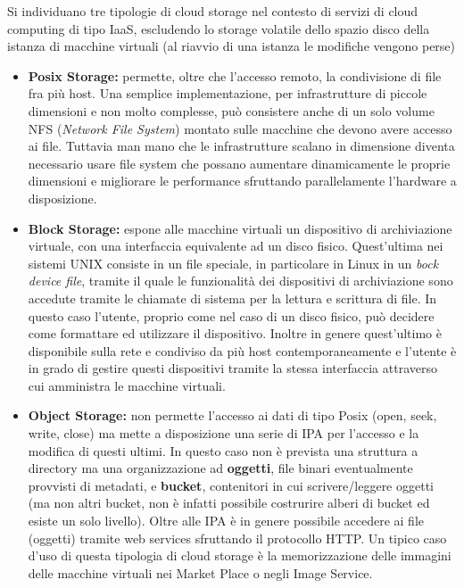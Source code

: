 \documentclass[italian,]{article}
\providecommand{\tightlist}{%
  \setlength{\itemsep}{0pt}\setlength{\parskip}{0pt}}
\begin{document}
Si individuano tre tipologie di cloud storage nel contesto di servizi di
cloud computing di tipo IaaS, escludendo lo storage volatile dello
spazio disco della istanza di macchine virtuali (al riavvio di una
istanza le modifiche vengono perse)

\begin{itemize}
\tightlist
\item
  \textbf{Posix Storage:} permette, oltre che l'accesso remoto, la
  condivisione di file fra più host. Una semplice implementazione, per
  infrastrutture di piccole dimensioni e non molto complesse, può
  consistere anche di un solo volume NFS (\emph{Network File System})
  montato sulle macchine che devono avere accesso ai file. Tuttavia man
  mano che le infrastrutture scalano in dimensione diventa necessario
  usare file system che possano aumentare dinamicamente le proprie
  dimensioni e migliorare le performance sfruttando parallelamente
  l'hardware a disposizione.
\item
  \textbf{Block Storage:} espone alle macchine virtuali un dispositivo
  di archiviazione virtuale, con una interfaccia equivalente ad un disco
  fisico. Quest'ultima nei sistemi UNIX consiste in un file speciale, in
  particolare in Linux in un \emph{bock device file}, tramite il quale
  le funzionalità dei dispositivi di archiviazione sono accedute tramite
  le chiamate di sistema per la lettura e scrittura di file. In questo
  caso l'utente, proprio come nel caso di un disco fisico, può decidere
  come formattare ed utilizzare il dispositivo. Inoltre in genere
  quest'ultimo è disponibile sulla rete e condiviso da più host
  contemporaneamente e l'utente è in grado di gestire questi dispositivi
  tramite la stessa interfaccia attraverso cui amministra le macchine
  virtuali.
\item
  \textbf{Object Storage:} non permette l'accesso ai dati di tipo Posix
  (open, seek, write, close) ma mette a disposizione una serie di IPA
  per l'accesso e la modifica di questi ultimi. In questo caso non è
  prevista una struttura a directory ma una organizzazione ad
  \textbf{oggetti}, file binari eventualmente provvisti di metadati, e
  \textbf{bucket}, contenitori in cui scrivere/leggere oggetti (ma non
  altri bucket, non è infatti possibile costrurire alberi di bucket ed
  esiste un solo livello). Oltre alle IPA è in genere possibile accedere
  ai file (oggetti) tramite web services sfruttando il protocollo HTTP.
  Un tipico caso d'uso di questa tipologia di cloud storage è la
  memorizzazione delle immagini delle macchine virtuali nei Market Place
  o negli Image Service.
\end{itemize}
\end{document}
